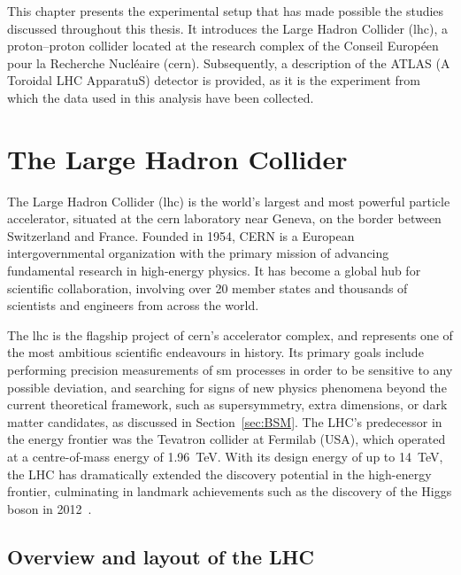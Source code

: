 This chapter presents the experimental setup that has made possible the studies discussed throughout this thesis. It introduces the Large Hadron Collider (\acrshort{lhc}), a proton--proton collider located at the research complex of the Conseil Européen pour la Recherche Nucléaire (\acrshort{cern}). Subsequently, a description of the ATLAS (A Toroidal LHC ApparatuS) detector is provided, as it is the experiment from which the data used in this analysis have been collected.

\section{The Large Hadron Collider}
\label{sec:LHC}

The Large Hadron Collider (\acrshort{lhc}) is the world's largest and most powerful particle accelerator, situated at the \acrshort{cern} laboratory near Geneva, on the border between Switzerland and France. Founded in 1954, CERN is a European intergovernmental organization with the primary mission of advancing fundamental research in high-energy physics. It has become a global hub for scientific collaboration, involving over 20 member states and thousands of scientists and engineers from across the world.

The \acrshort{lhc} is the flagship project of \acrshort{cern}'s accelerator complex, and represents one of the most ambitious scientific endeavours in history. Its primary goals include performing precision measurements of \acrshort{sm} processes in order to be sensitive to any possible deviation, and searching for signs of new physics phenomena beyond the current theoretical framework, such as supersymmetry, extra dimensions, or dark matter candidates, as discussed in Section~\ref{sec:BSM}. The LHC's predecessor in the energy frontier was the Tevatron collider at Fermilab (USA), which operated at a centre-of-mass energy of 1.96~TeV. With its design energy of up to 14~TeV, the LHC has dramatically extended the discovery potential in the high-energy frontier, culminating in landmark achievements such as the discovery of the Higgs boson in 2012~\cite{ATLAS:2012yve,CMS:2012qbp}.

\subsection*{Overview and layout of the LHC}

